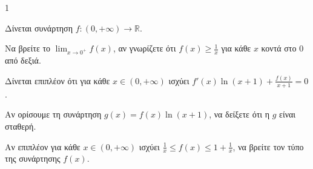 \begin{ylh}{1}
    \item [Συναρτήσεις, Όρια, Παράγωγοι]
\end{ylh}
Δίνεται συνάρτηση $f:(0, +\infty) \to \mathbb{R}$.
\begin{alist}
    \item Να βρείτε το $\lim_{x \to 0^+} f(x)$, αν γνωρίζετε ότι $f(x) \geq \frac{1}{x}$ για κάθε $x$ κοντά στο $0$ από δεξιά. 
    \item Δίνεται επιπλέον ότι για κάθε $x \in (0, +\infty)$ ισχύει $f'(x)\ln(x+1) + \frac{f(x)}{x+1} = 0$.
    \begin{rlist}
        \item Αν ορίσουμε τη συνάρτηση $g(x) = f(x)\ln(x+1)$, να δείξετε ότι η $g$ είναι σταθερή. 
        \item Αν επιπλέον για κάθε $x \in (0, +\infty)$ ισχύει $\frac{1}{x} \leq f(x) \leq 1 + \frac{1}{x}$, να βρείτε τον τύπο της συνάρτησης $f(x)$. 
    \end{rlist}
\end{alist}